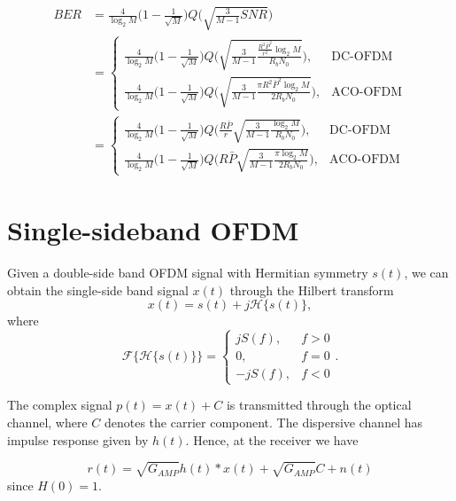 \documentclass[a4paper]{article}
\begin{document}
\begin{align} \nonumber
BER &= \frac{4}{\log_2M}\bigg(1 - \frac{1}{\sqrt{M}}\bigg)Q\bigg(\sqrt{\frac{3}{M-1}SNR}\bigg) \\ 
& =\begin{cases}
\frac{4}{\log_2M}\bigg(1 - \frac{1}{\sqrt{M}}\bigg)Q\bigg(\sqrt{\frac{3}{M-1}\frac{\frac{R^2\bar{P}^2}{r^2}\log_2M}{R_bN_0}}\bigg), &\text{DC-OFDM} \\
\frac{4}{\log_2M}\bigg(1 - \frac{1}{\sqrt{M}}\bigg)Q\bigg(\sqrt{\frac{3}{M-1}\frac{\pi R^2\bar{P}^2\log_2M}{2R_bN_0}}\bigg), &\text{ACO-OFDM}
\end{cases} \\
& =\begin{cases}
\frac{4}{\log_2M}\bigg(1 - \frac{1}{\sqrt{M}}\bigg)Q\bigg(\frac{R\bar{P}}{r}\sqrt{\frac{3}{M-1}\frac{\log_2M}{R_bN_0}}\bigg), &\text{DC-OFDM} \\
\frac{4}{\log_2M}\bigg(1 - \frac{1}{\sqrt{M}}\bigg)Q\bigg(R\bar{P}\sqrt{\frac{3}{M-1}\frac{\pi\log_2M}{2R_bN_0}}\bigg), &\text{ACO-OFDM}
\end{cases}
\end{align}

\section{Single-sideband OFDM}

Given a double-side band OFDM signal with Hermitian symmetry $s(t)$, we can obtain the single-side band signal $x(t)$ through the Hilbert transform
\begin{equation}
x(t) = s(t) + j\mathcal{H}\{s(t)\},
\end{equation}
where
\begin{equation}
\mathcal{F}\big\{\mathcal{H}\{s(t)\}\big\} = \begin{cases}
jS(f), & f > 0 \\
0, & f = 0 \\
-jS(f), & f < 0
\end{cases}.
\end{equation}

The complex signal $p(t) = x(t) + C$ is transmitted through the optical channel, where $C$ denotes the carrier component. The dispersive channel has impulse response given by $h(t)$. Hence, at the receiver we have

\begin{equation}
r(t) = \sqrt{G_{AMP}} h(t)\ast x(t) + \sqrt{G_{AMP}}C + n(t)
\end{equation}
since $H(0) = 1$.
\end{document}
